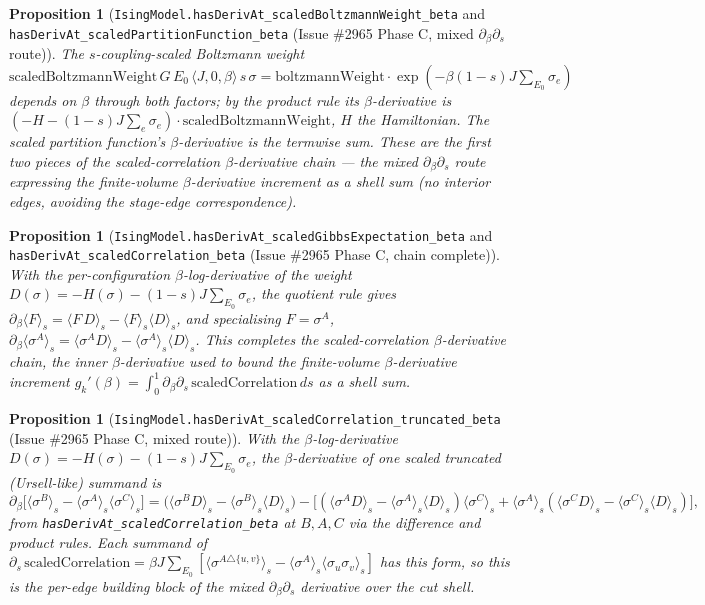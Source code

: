 \documentclass[a4paper,11pt]{article}
\newtheorem{proposition}[theorem]{Proposition}
\begin{document}
\begin{proposition}[\texttt{IsingModel.hasDerivAt\_scaledBoltzmannWeight\_beta} and
\texttt{hasDerivAt\_scaledPartitionFunction\_beta} (Issue \#2965 Phase C, mixed
$\partial_\beta\partial_s$ route)]
The $s$-coupling-scaled Boltzmann weight
$\mathrm{scaledBoltzmannWeight}\,G\,E_0\,\langle J,0,\beta\rangle\,s\,\sigma
=\mathrm{boltzmannWeight}\cdot\exp(-\beta(1-s)J\sum_{E_0}\sigma_e)$ depends on
$\beta$ through both factors; by the product rule its $\beta$-derivative is
$(-H-(1-s)J\sum_e\sigma_e)\cdot\mathrm{scaledBoltzmannWeight}$, $H$ the Hamiltonian.
The scaled partition function's $\beta$-derivative is the termwise sum. These are
the first two pieces of the scaled-correlation $\beta$-derivative chain — the mixed
$\partial_\beta\partial_s$ route expressing the finite-volume $\beta$-derivative
increment as a shell sum (no interior edges, avoiding the stage-edge
correspondence).
\end{proposition}

\begin{proposition}[\texttt{IsingModel.hasDerivAt\_scaledGibbsExpectation\_beta} and
\texttt{hasDerivAt\_scaledCorrelation\_beta} (Issue \#2965 Phase C, chain complete)]
With the per-configuration $\beta$-log-derivative of the weight
$D(\sigma)=-H(\sigma)-(1-s)J\sum_{E_0}\sigma_e$, the quotient rule gives
$\partial_\beta\langle F\rangle_s=\langle F\,D\rangle_s-\langle F\rangle_s\langle
D\rangle_s$, and specialising $F=\sigma^A$,
$\partial_\beta\langle\sigma^A\rangle_s=\langle\sigma^A
D\rangle_s-\langle\sigma^A\rangle_s\langle D\rangle_s$. This completes the
scaled-correlation $\beta$-derivative chain, the inner $\beta$-derivative used to
bound the finite-volume $\beta$-derivative increment
$g_k'(\beta)=\int_0^1\partial_\beta\partial_s\,\mathrm{scaledCorrelation}\,ds$ as a
shell sum.
\end{proposition}

\begin{proposition}[\texttt{IsingModel.hasDerivAt\_scaledCorrelation\_truncated\_beta}
(Issue \#2965 Phase C, mixed route)]
With the $\beta$-log-derivative $D(\sigma)=-H(\sigma)-(1-s)J\sum_{E_0}\sigma_e$, the
$\beta$-derivative of one scaled truncated (Ursell-like) summand is
\[
  \partial_\beta\bigl[\langle\sigma^B\rangle_s-\langle\sigma^A\rangle_s\langle\sigma^C\rangle_s\bigr]
  = \bigl(\langle\sigma^B D\rangle_s-\langle\sigma^B\rangle_s\langle D\rangle_s\bigr)
    -\bigl[(\langle\sigma^A D\rangle_s-\langle\sigma^A\rangle_s\langle D\rangle_s)\langle\sigma^C\rangle_s
      +\langle\sigma^A\rangle_s(\langle\sigma^C D\rangle_s-\langle\sigma^C\rangle_s\langle D\rangle_s)\bigr],
\]
from \texttt{hasDerivAt\_scaledCorrelation\_beta} at $B,A,C$ via the difference and
product rules. Each summand of
$\partial_s\,\mathrm{scaledCorrelation}=\beta J\sum_{E_0}[\langle\sigma^{A\triangle\{u,v\}}\rangle_s
-\langle\sigma^A\rangle_s\langle\sigma_u\sigma_v\rangle_s]$ has this form, so this is
the per-edge building block of the mixed $\partial_\beta\partial_s$ derivative over
the cut shell.
\end{proposition}
\end{document}
